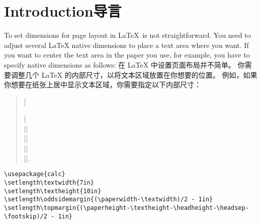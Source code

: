  

 \section{Introduction\hfill 导言}

\begin{paracol}{2}
 To set dimensions for page layout in \LaTeX\ is not straightforward. 
 You need to adjust several \LaTeX{} native dimensions to place a text area
 where you want.
 If you want to center the text area in the paper you use, for example, 
 you have to specify native dimensions as follows:
\switchcolumn 
在 {\LaTeX} 中设置页面布局并不简单。
你需要调整几个 {\LaTeX} 的内部尺寸，以将文本区域放置在你想要的位置。
例如，如果你想要在纸张上居中显示文本区域，你需要指定以下内部尺寸：
\switchcolumn
 \begin{quote}
    |\usepackage{calc}|\\
    |\setlength\textwidth{7in}|\\
    |\setlength\textheight{10in}|\\
    |\setlength{}|\\
    |\setlength{}|.
 \end{quote}
\switchcolumn
\begin{verbatim}
\usepackage{calc}
\setlength\textwidth{7in}
\setlength\textheight{10in}
\setlength\oddsidemargin{(\paperwidth-\textwidth)/2 - 1in}
\setlength\topmargin{(\paperheight-\textheight-\headheight-\headsep-\footskip)/2 - 1in}
\end{verbatim}
\end{paracol}





